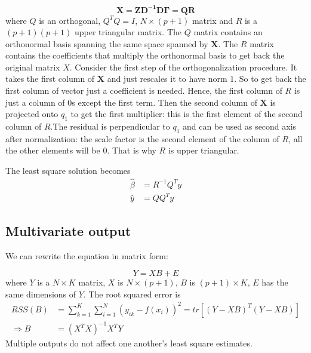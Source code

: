\documentclass[12pt, letterpaper]{article}
\theoremstyle{definition}
\newcommand{\X}{\mathrm{\mathbf{X}}}
\begin{document}
\begin{equation}
\mathbf{X = ZD^{-1}D\Gamma = QR}
\end{equation}
where $Q$ is an orthogonal, $Q^TQ=I$, $ N\times(p+1)$ matrix and $R$ is a $(p+1)(p+1)$ upper triangular matrix. The $Q$ matrix contains an orthonormal basis spanning the same space spanned by $\X$. The $R$ matrix contains the coefficients that multiply the orthonormal basis to get back the original matrix $X$. Consider the first step of the orthogonalization procedure. It takes the first column of $\X$ and just rescales it to have norm $1$. So to get back the first column of vector just a coefficient is needed. Hence, the first column of $R$ is just a column of $0$s except the first term. Then the second column of $\X$ is projected onto $q_1$ to get the first multiplier: this is the first element of the second column of $R$.The residual is perpendicular to $q_1$ and can be used as second axis after normalization: the scale factor is the second element of the column of $R$, all the other elements will be $0$. That is why $R$ is upper triangular.

The least square solution becomes 
\begin{equation}
\begin{aligned}
\hat{\beta} &= R^{-1}Q^Ty\\
\hat{y} &= QQ^Ty
\end{aligned}
\end{equation}

\subsection{Multivariate output}
We can rewrite the equation in matrix form:

\begin{equation}
Y = XB + E
\end{equation}
where $Y$ is  a $N\times K$ matrix, $X$ is $N\times(p+1)$, $B$ is $(p+1)\times K$, $E$ has the same dimensions of $Y$.
The root squared error is 
\begin{equation}
\begin{aligned}
RSS(B) &= \sum_{k=1}^K\sum_{i=1}^N\left(y_{ik}-f(x_i)\right)^2 = tr \left[  \left( Y-XB\right)^T\left( Y-XB\right) \right]	\\
\Rightarrow B &= \left( X^TX\right)^{-1}X^TY
\end{aligned}
\end{equation}
Multiple outputs do not affect one another's least square estimates.
\end{document}
